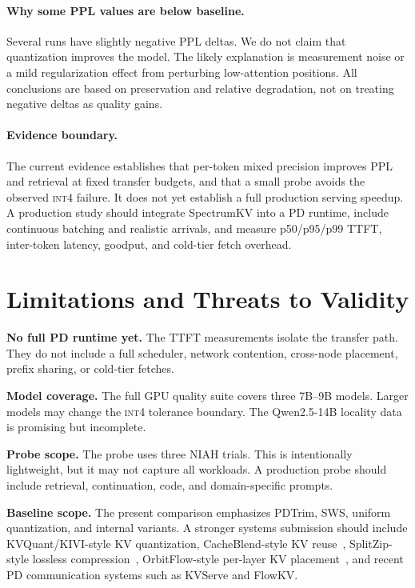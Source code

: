 \documentclass[11pt]{article}
\newcommand{\method}{SpectrumKV}
\newcommand{\niah}{NIAH}
\newcommand{\intiv}{\textsc{int4}}
\theoremstyle{plain}
\theoremstyle{definition}
\begin{document}
\paragraph{Why some PPL values are below baseline.}
Several runs have slightly negative PPL deltas.  We do not claim that quantization improves the model.  The likely explanation is measurement noise or a mild regularization effect from perturbing low-attention positions.  All conclusions are based on preservation and relative degradation, not on treating negative deltas as quality gains.

\paragraph{Evidence boundary.}
The current evidence establishes that per-token mixed precision improves PPL and retrieval at fixed transfer budgets, and that a small probe avoids the observed \intiv{} failure.  It does not yet establish a full production serving speedup.  A production study should integrate \method{} into a PD runtime, include continuous batching and realistic arrivals, and measure p50/p95/p99 TTFT, inter-token latency, goodput, and cold-tier fetch overhead.

\section{Limitations and Threats to Validity}
\label{sec:limitations}

\textbf{No full PD runtime yet.}  The TTFT measurements isolate the transfer path.  They do not include a full scheduler, network contention, cross-node placement, prefix sharing, or cold-tier fetches.

\textbf{Model coverage.}  The full GPU quality suite covers three 7B--9B models.  Larger models may change the \intiv{} tolerance boundary.  The Qwen2.5-14B locality data is promising but incomplete.

\textbf{Probe scope.}  The probe uses three \niah{} trials.  This is intentionally lightweight, but it may not capture all workloads.  A production probe should include retrieval, continuation, code, and domain-specific prompts.

\textbf{Baseline scope.}  The present comparison emphasizes PDTrim, SWS, uniform quantization, and internal variants.  A stronger systems submission should include KVQuant/KIVI-style KV quantization, CacheBlend-style KV reuse~\citep{cacheblend}, SplitZip-style lossless compression~\citep{splitzip}, OrbitFlow-style per-layer KV placement~\citep{orbitflow}, and recent PD communication systems such as KVServe and FlowKV.
\end{document}
